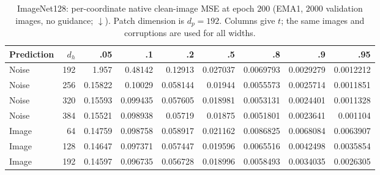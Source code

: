 \begin{table}[H]
\centering
\caption{ImageNet128: per-coordinate native clean-image MSE at epoch $200$ (EMA1, $2000$ validation images, no guidance; $\downarrow$). Patch dimension is $d_p=192$. Columns give $t$; the same images and corruptions are used for all widths.}
\label{tab:width-loss-grid-128}
\small
\setlength{\tabcolsep}{3pt}
\begin{tabular}{lrrrrrrrr}
\toprule
Prediction & $d_h$ & .05 & .1 & .2 & .5 & .8 & .9 & .95\\
\midrule
Noise & 192 & 1.957 & 0.48142 & 0.12913 & 0.027037 & 0.0069793 & 0.0029279 & 0.0012212\\
Noise & 256 & 0.15822 & 0.10029 & 0.058144 & 0.01944 & 0.0055573 & 0.0025714 & 0.0011851\\
Noise & 320 & 0.15593 & 0.099435 & 0.057605 & 0.018981 & 0.0053131 & 0.0024401 & 0.0011328\\
Noise & 384 & 0.15521 & 0.098938 & 0.05719 & 0.01875 & 0.0051801 & 0.0023641 & 0.001104\\
Image & 64 & 0.14759 & 0.098758 & 0.058917 & 0.021162 & 0.0086825 & 0.0068084 & 0.0063907\\
Image & 128 & 0.14647 & 0.097371 & 0.057447 & 0.019596 & 0.0065516 & 0.0042498 & 0.0035854\\
Image & 192 & 0.14597 & 0.096735 & 0.056728 & 0.018996 & 0.0058493 & 0.0034035 & 0.0026305\\
\bottomrule
\end{tabular}
\end{table}
